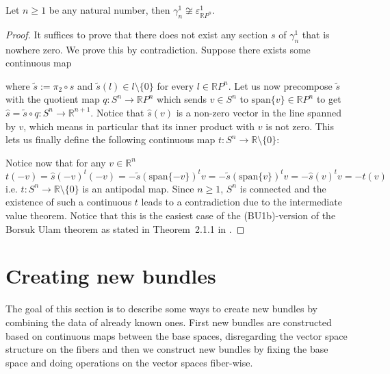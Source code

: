\begin{proposition} Let $n\geq1$ be any natural number, then $\gamma_n^1\not\cong\varepsilon_{\mathbb{R}P^n}^1$.
\end{proposition}
\begin{proof} It suffices to prove that there does not exist any section $s$ of $\gamma_n^1$ that is nowhere zero. We prove this by contradiction. Suppose there exists some continuous map
\begin{center}
\end{center}
where $\tilde{s}:=\pi_2\circ s$ and $\tilde{s}(l)\in l\setminus\{0\}$ for every $l\in\mathbb{R}P^n$. Let us now precompose $\tilde{s}$ with the quotient map $q:S^n\to\mathbb{R}P^n$ which sends $v\in S^n$ to $\mathrm{span}\{v\}\in\mathbb{R}P^n$ to get $\hat{s}=\tilde{s}\circ q:S^n\to\mathbb{R}^{n+1}$. Notice that $\hat{s}(v)$ is a non-zero vector in the line spanned by $v$, which means in particular that its inner product with $v$ is not zero. This lets us finally define the following continuous map $t:S^n\to\mathbb{R}\setminus\{0\}$:
\begin{center}
\end{center}
Notice now that for any $v\in\mathbb{R}^n$
\[t(-v)=\hat{s}(-v)^t(-v)=-\tilde{s}(\mathrm{span}\{-v\})^tv=-\tilde{s}(\mathrm{span}\{v\})^tv=-\hat{s}(v)^tv=-t(v)\]
i.e. $t:S^n\to\mathbb{R}\setminus\{0\}$ is an antipodal map. Since $n\geq1$, $S^n$ is connected and the existence of such a continuous $t$ leads to a contradiction due to the intermediate value theorem. Notice that this is the easiest case of the (BU1b)-version of the Borsuk Ulam theorem as stated in Theorem~2.1.1 in \cite{BU_Matousek}.
\end{proof}

\section{Creating new bundles}
The goal of this section is to describe some ways to create new bundles by combining the data of already known ones. First new bundles are constructed based on continuous maps between the base spaces, disregarding the vector space structure on the fibers and then we construct new bundles by fixing the base space and doing operations on the vector spaces fiber-wise.

